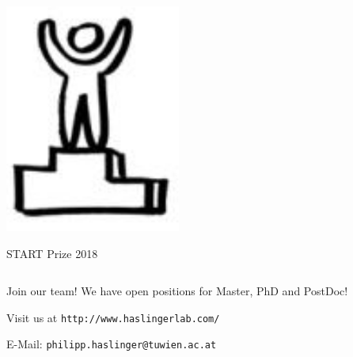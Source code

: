 \documentclass[final]{beamer}
\begin{document}
\begin{frame}[fragile]{}
\begin{columns}[T]
\begin{column}{.49\linewidth}
\begin{block}{}
\begin{columns}
\begin{column}{0.07\columnwidth}
            \includegraphics[width=\columnwidth]{figures/logo-start.png}

            START Prize 2018
          \end{column}
        \end{columns}
      \end{block}


      \begin{block}{\Large Join our team!}
        We have open positions for Master, PhD and PostDoc!

        Visit us at \texttt{http://www.haslingerlab.com/}

        E-Mail: \texttt{philipp.haslinger@tuwien.ac.at}
      \end{block}
    \end{column}

  \end{columns}

\end{frame}
\end{document}
